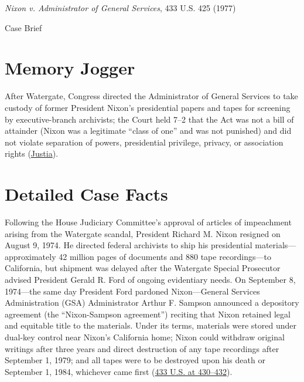 \documentclass[12pt]{article}
\begin{document}
\begin{center}
{\LARGE \textit{Nixon v. Administrator of General Services}, 433 U.S. 425 (1977)\par}
\vspace{0.8em}
{\large Case Brief\par}
\end{center}
\vspace{1em}

\section{Memory Jogger}
After Watergate, Congress directed the Administrator of General Services to take custody of former President Nixon's presidential papers and tapes for screening by executive-branch archivists; the Court held 7--2 that the Act was not a bill of attainder (Nixon was a legitimate ``class of one'' and was not punished) and did not violate separation of powers, presidential privilege, privacy, or association rights (\href{https://supreme.justia.com/cases/federal/us/433/425/}{Justia}).

\section{Detailed Case Facts}
Following the House Judiciary Committee's approval of articles of impeachment arising from the Watergate scandal, President Richard M. Nixon resigned on August 9, 1974. He directed federal archivists to ship his presidential materials---approximately 42 million pages of documents and 880 tape recordings---to California, but shipment was delayed after the Watergate Special Prosecutor advised President Gerald R. Ford of ongoing evidentiary needs. On September 8, 1974---the same day President Ford pardoned Nixon---General Services Administration (GSA) Administrator Arthur F. Sampson announced a depository agreement (the ``Nixon-Sampson agreement'') reciting that Nixon retained legal and equitable title to the materials. Under its terms, materials were stored under dual-key control near Nixon's California home; Nixon could withdraw original writings after three years and direct destruction of any tape recordings after September 1, 1979; and all tapes were to be destroyed upon his death or September 1, 1984, whichever came first (\href{https://supreme.justia.com/cases/federal/us/433/425/}{433 U.S. at 430--432}).
\end{document}
